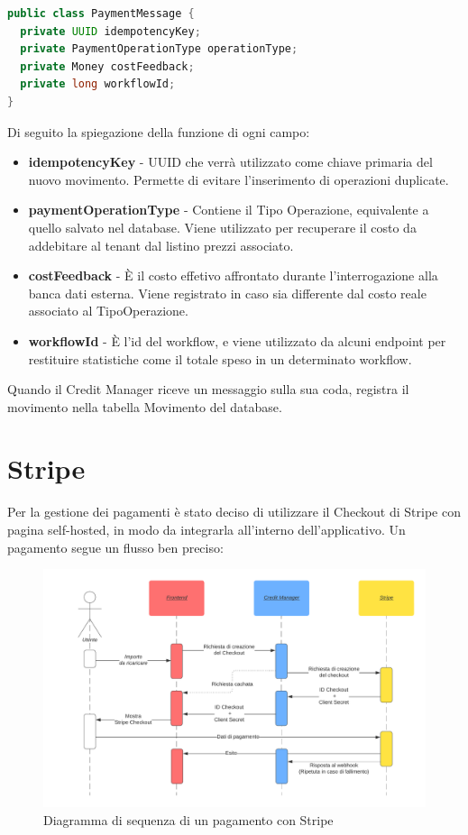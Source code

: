 \begin{lstlisting}[language=Java]
public class PaymentMessage {
  private UUID idempotencyKey;
  private PaymentOperationType operationType;
  private Money costFeedback;
  private long workflowId;
}
\end{lstlisting}
Di seguito la spiegazione della funzione di ogni campo:
\begin{itemize}
  \item \textbf{idempotencyKey} - UUID che verr\`a utilizzato come chiave primaria del nuovo movimento. Permette di evitare l'inserimento
    di operazioni duplicate.
  \item \textbf{paymentOperationType} - Contiene il Tipo Operazione, equivalente a quello salvato nel database. Viene utilizzato per recuperare il costo da addebitare
    al tenant dal listino prezzi associato.
  \item \textbf{costFeedback} - \`E il costo effetivo affrontato durante l'interrogazione alla banca dati esterna. Viene registrato in caso sia differente dal costo reale associato al TipoOperazione.
  \item \textbf{workflowId} - \`E l'id del workflow, e viene utilizzato da alcuni endpoint per restituire statistiche come il totale speso in un determinato workflow.
\end{itemize}
Quando il Credit Manager riceve un messaggio sulla sua coda, registra il movimento nella tabella Movimento del database.

\section{Stripe}
Per la gestione dei pagamenti \`e stato deciso di utilizzare il Checkout di Stripe con pagina self-hosted, in modo da integrarla all'interno dell'applicativo. Un pagamento segue un flusso ben preciso:
\begin{figure}[H]
  \centering
  \includegraphics[width=14cm]{images/stripe-pagamento-diagramma.png}
  \caption{Diagramma di sequenza di un pagamento con Stripe}
  \label{stripepayment}
\end{figure}

